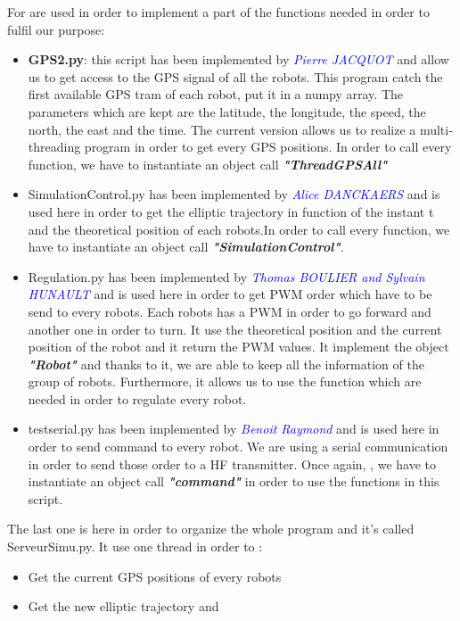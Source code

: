 For are used in order to implement a part of the functions needed in order to fulfil our purpose:
\begin{itemize}

\item \textbf{GPS2.py}: this script has been implemented by \textcolor{blue}{\textit{Pierre JACQUOT}} and allow us to get access to the GPS signal of all the robots. This program catch the first available GPS tram of each robot, put it in a numpy array. The parameters which are kept are the latitude, the longitude, the speed, the north, the east and the time. The current version allows us to realize a multi-threading program in order to get every GPS positions. In order to call every function, we have to instantiate an object call \textbf{\textit{"ThreadGPSAll"}}
\item SimulationControl.py has been implemented by  \textcolor{blue}{\textit{Alice DANCKAERS}} and is used here in order to get the elliptic trajectory in function of the instant t and the theoretical position of each robots.In order to call every function, we have to instantiate an object call \textbf{\textit{"SimulationControl"}}.
\item Regulation.py has been implemented by  \textcolor{blue}{\textit{Thomas BOULIER and Sylvain HUNAULT}} and is used here in order to get PWM order which have to be send to every robots. Each robots has a PWM in order to go forward and another one in order to turn. It use the theoretical position and the current position of the robot and it return the PWM values. It implement the object \textbf{\textit{"Robot"}} and thanks to it, we are able to keep all the information of the group of robots. Furthermore, it allows us to use the function which are needed in order to regulate every robot. 
\item testserial.py has been implemented by  \textcolor{blue}{\textit{Benoit Raymond }} and is used here in order to send command to every robot. We are using a serial communication in order to send those order to a HF transmitter. Once again, , we have to instantiate an object call \textbf{\textit{"command"}} in order to use the functions in this script.

\end{itemize}

The last one is here in order to organize the whole program and it's called ServeurSimu.py.
It use one thread in order to :
\begin{itemize}
\item Get the current GPS positions of every robots
\item Get the new elliptic trajectory and 
\end{itemize}


\pagebreak